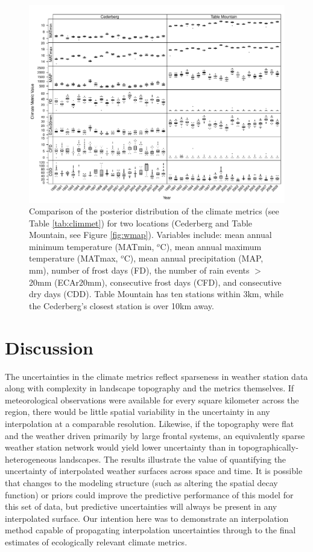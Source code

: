 \documentclass[12pt]{article}
\begin{document}
\begin{figure}
  \begin{center}
    \includegraphics[page=1,width=\textwidth]{Figure7.pdf} \caption{Comparison
 of the posterior distribution of the climate metrics (see Table \ref{tab:climmet})  for two locations
 (Cederberg and Table Mountain, see Figure \ref{fig:wmap}).  Variables include: mean annual minimum temperature (MATmin, $^o$C), mean annual maximum temperature (MATmax, $^o$C), mean annual precipitation (MAP, mm),  number of frost days (FD), the number of rain events $>$ 20mm (ECAr20mm), consecutive frost days (CFD), and consecutive dry days (CDD).  Table
 Mountain has ten stations within 3km, while the Cederberg's closest
 station is over 10km away.}
    \label{fig:nearfar}
\end{center}
\end{figure}

\section{Discussion}

The uncertainties in the climate metrics reflect sparseness in weather
station data along with complexity in landscape topography and the
metrics themselves.
If meteorological observations were available for every square kilometer across the
region, there would be little spatial variability in the uncertainty in any interpolation at a
comparable resolution.
Likewise, if the topography were flat and the weather driven primarily by
large frontal systems, an equivalently sparse weather
station network would yield lower uncertainty than in topographically-heterogeneous landscapes. 
The results illustrate the value of quantifying the uncertainty of
interpolated weather surfaces across space and time. 
It is possible that changes to the modeling structure (such as
altering the spatial decay function) or priors could improve the predictive
performance of this model for this set of data, but predictive
uncertainties will always be present in any interpolated surface.  
Our intention here was to demonstrate an interpolation method capable
of propagating interpolation uncertainties through to
the final estimates of ecologically relevant climate metrics.  
\end{document}
